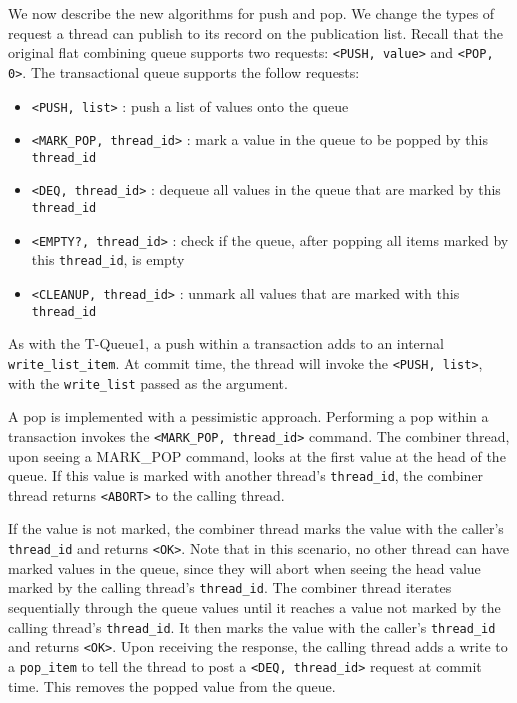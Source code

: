 We now describe the new algorithms for push and pop.  We change the types of request a thread can publish to its record on the publication list. Recall that the original flat combining queue supports two requests: \texttt{<PUSH, value>} and \texttt{<POP, 0>}. The transactional queue supports the follow requests:
\begin{itemize}
    \item \texttt{<PUSH, list>} : push a list of values onto the queue
    \item \texttt{<MARK\_POP, thread\_id>} : mark a value in the queue to be popped by this \texttt{thread\_id}
    \item \texttt{<DEQ, thread\_id>} : dequeue all values in the queue that are marked by this \texttt{thread\_id}
    \item \texttt{<EMPTY?, thread\_id>} : check if the queue, after popping all items marked by this \texttt{thread\_id}, is empty
    \item \texttt{<CLEANUP, thread\_id>} : unmark all values that are marked with this \texttt{thread\_id}
\end{itemize}

As with the T-Queue1, a push within a transaction adds to an internal \texttt{write\_list\_item}. At commit time, the thread will invoke the \texttt{<PUSH, list>}, with the \texttt{write\_list} passed as the argument.

A pop is implemented with a pessimistic approach. Performing a pop within a transaction invokes the \texttt{<MARK\_POP, thread\_id>} command. The combiner thread, upon seeing a MARK\_POP command, looks at the first value at the head of the queue. If this value is marked with another thread's \texttt{thread\_id}, the combiner thread returns \texttt{<ABORT>} to the calling thread.

If the value is not marked, the combiner thread marks the value with the caller's \texttt{thread\_id} and returns \texttt{<OK>}. Note that in this scenario, no other thread can have marked values in the queue, since they will abort when seeing the head value marked by the calling thread's \texttt{thread\_id}. The combiner thread iterates sequentially through the queue values until it reaches a value not marked by the calling thread's \texttt{thread\_id}. It then marks the value with the caller's \texttt{thread\_id} and returns \texttt{<OK>}. Upon receiving the response, the calling thread adds a write to a \texttt{pop\_item} to tell the thread to post a \texttt{<DEQ, thread\_id>} request at commit time. This removes the popped value from the queue.

